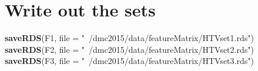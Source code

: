 \documentclass[10pt]{report}
\newenvironment{Shaded}{}{}
\newcommand{\KeywordTok}[1]{\textcolor[rgb]{0.00,0.44,0.13}{\textbf{{#1}}}}
\newcommand{\DataTypeTok}[1]{\textcolor[rgb]{0.56,0.13,0.00}{{#1}}}
\newcommand{\StringTok}[1]{\textcolor[rgb]{0.25,0.44,0.63}{{#1}}}
\newcommand{\NormalTok}[1]{{#1}}
\begin{document}
\section{Write out the sets}\label{write-out-the-sets}

\begin{Shaded}
\begin{Highlighting}[]
\KeywordTok{saveRDS}\NormalTok{(F1, }\DataTypeTok{file =} \StringTok{"~/dmc2015/data/featureMatrix/HTVset1.rds"}\NormalTok{)}
\KeywordTok{saveRDS}\NormalTok{(F2, }\DataTypeTok{file =} \StringTok{"~/dmc2015/data/featureMatrix/HTVset2.rds"}\NormalTok{)}
\KeywordTok{saveRDS}\NormalTok{(F3, }\DataTypeTok{file =} \StringTok{"~/dmc2015/data/featureMatrix/HTVset3.rds"}\NormalTok{)}
\end{Highlighting}
\end{Shaded}
\end{document}
